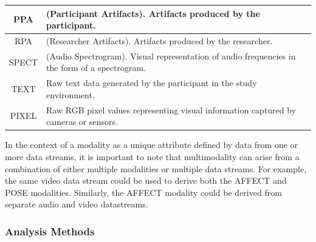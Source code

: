 \documentclass[manuscript,screen,review]{acmart}
\begin{document}
\begin{table}[ht]
\begin{tabular}{|c|p{}|}
    \hline
    PPA & (Participant Artifacts). Artifacts produced by the participant. \\
    \hline
    RPA & (Researcher Artifacts). Artifacts produced by the researcher. \\
    \hline
    SPECT & (Audio Spectrogram). Visual representation of audio frequencies in the form of a spectrogram. \\
    \hline
    TEXT & Raw text data generated by the participant in the study environment. \\
    \hline
    PIXEL & Raw RGB pixel values representing visual information captured by cameras or sensors. \\
    \hline
  \end{tabular}
  \label{tab:modalities}
\end{table}

In the context of a modality as a unique attribute defined by data from one or more data streams, it is important to note that multimodality can arise from a combination of either multiple modalities or multiple data streams. For example, the same video data stream could be used to derive both the AFFECT and POSE modalities. %
Similarly, the AFFECT modality could be derived from separate audio and video datastreams. %

\subsubsection{Analysis Methods} \label{subsec:analyis_methods}
\end{document}
